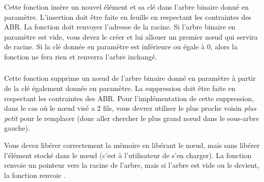 \subsubsection*{}

\noindent Cette fonction insère un nouvel élément et sa clé dans l'arbre binaire donné en paramètre.
L'insertion doit être faite en feuille en respectant les contraintes des ABR.
La fonction doit renvoyer l'adresse de la racine.
Si l'arbre binaire en paramètre est vide, vous devez le créer et lui allouer un premier nœud qui servira de racine.
Si la clé donnée en paramètre est inférieure ou égale à $ 0 $, alors la fonction ne fera rien et renverra l'arbre inchangé.

\bigskip


\subsubsection*{}

\noindent Cette fonction supprime un nœud de l'arbre binaire donné en paramètre à partir de la clé également donnée en paramètre.
La suppression doit être faite en respectant les contraintes des ABR.
Pour l'implémentation de cette suppression, dans le cas où le nœud visé a 2 fils, vous devrez utiliser le plus proche voisin \textit{plus petit} pour le remplacer (donc aller chercher le plus grand nœud dans le sous-arbre gauche).

\noindent Vous devez libérer correctement la mémoire en libérant le nœud, mais sans libérer l'élément stocké dans le nœud (c'est à l'utilisateur de s'en charger).
La fonction renvoie un pointeur vers la racine de l'arbre, mais si l'arbre est vide ou le devient, la fonction renvoie .

\medskip


\subsubsection*{}

